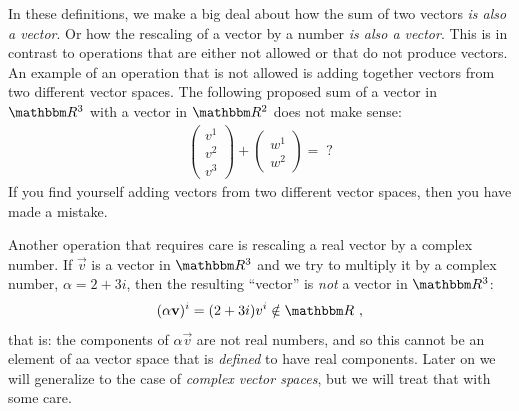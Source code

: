 In these definitions, we make a big deal about how the sum of two vectors \emph{is also a vector}. Or how the rescaling of a vector by a number \emph{is also a vector}. This is in contrast to operations that are either not allowed or that do not produce vectors. An example of an operation that is not allowed is adding together vectors from two different vector spaces. The following proposed sum of a vector in $\RR ^3$ with  a vector in $\RR ^2$ does not make sense:
\begin{align}
    \begin{pmatrix}
        v^1\\ v^2 \\v^3
    \end{pmatrix}
    +
    \begin{pmatrix}
        w^1\\ w^2 
    \end{pmatrix}
    =
    \; ?
\end{align}
If you find yourself adding vectors from two different vector spaces, then you have made a mistake.

Another operation that requires care is rescaling a real vector by a complex number. If $\vec{v}$ is a vector in $\RR ^3$ and we try to multiply it by a complex number, $\alpha = 2+3i$, then the resulting ``vector'' is \emph{not} a vector in $\RR^3$:
\begin{align}
    (\alpha\vec{v})^i = (2+3i)v^i \notin \RR  \ ,
\end{align}
that is: the components of $\alpha\vec{v}$ are not real numbers, and so this cannot be an element of aa vector space that is \emph{defined} to have real components. Later on we will generalize to the case of \emph{complex vector spaces}, but we will treat that with some care.

